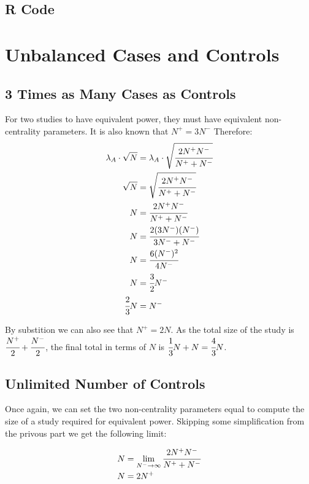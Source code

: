 \documentclass{article}
\begin{document}
\subsection{R Code}



\section{Unbalanced Cases and Controls}

\subsection{3 Times as Many Cases as Controls}

For two studies to have equivalent power, they must have equivalent non-centrality parameters. It is also known that $N^{+} = 3N^{-}$ Therefore: \\

\begin{align*}
\lambda_{A} \cdot \sqrt{N} &= \lambda_{A} \cdot \sqrt{\cfrac{2N^{+}N^{-}}{N^{+}+N^{-}}} \\
\sqrt{N} &= \sqrt{\cfrac{2N^{+}N^{-}}{N^{+}+N^{-}}} \\
N &= \cfrac{2N^{+}N^{-}}{N^{+}+N^{-}} \\
N &= \cfrac{2(3N^{-})(N^{-})}{3N^{-}+N^{-}} \\
N &= \cfrac{6(N^{-})^2}{4N^{-}} \\
N &= \cfrac{3}{2} N^{-} \\
\cfrac{2}{3} N &= N^{-}
\end{align*}

\noindent
By substition we can also see that $N^{+} = 2N$. As the total size of the study is $\cfrac{N^{+}}{2} + \cfrac{N^{-}}{2}$, the final total in terms of $N$ is $\cfrac{1}{3}N + N = \cfrac{4}{3}N$.

\subsection{Unlimited Number of Controls}

Once again, we can set the two non-centrality parameters equal to compute the size of a study required for equivalent power. Skipping some simplification from the privous part we get the following limit:

\begin{align*}
N &= \lim_{N^{-}\to\infty} \cfrac{2N^{+}N^{-}}{N^{+}+N^{-}} \\
N &= 2N^{+} \\
\end{align*}
\end{document}
